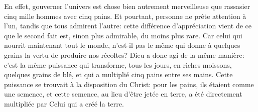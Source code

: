En effet, gouverner l’univers est chose bien autrement merveilleuse
		que rassasier cinq mille hommes avec cinq pains.
Et pourtant, personne ne prête attention à l’un, tandis que tous admirent l’autre:
	cette différence d’appréciation vient de ce que le second fait
		est, sinon plus admirable, du moins plus rare.
Car celui qui nourrit maintenant tout le monde,
	n’est-il pas le même qui donne à quelques grains
		la vertu de produire nos récoltes?
Dieu a donc agi de la même manière:
	c’est la même puissance qui transforme, tous les jours,
		en riches moissons, quelques grains de blé,
	et qui a multiplié cinq pains entre ses mains.
Cette puissance se trouvait à la disposition du Christ:
	pour les pains, ils étaient comme une semence,
	et cette semence, au lieu d’être jetée en terre,
	a été directement multipliée par Celui qui a créé la terre.
